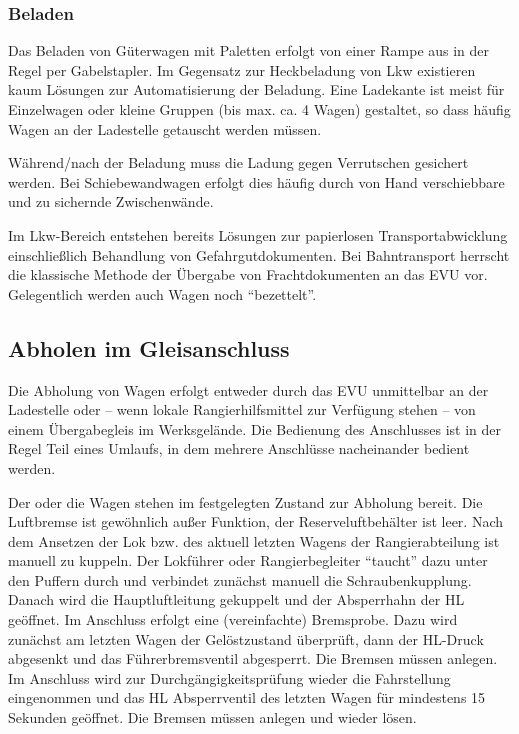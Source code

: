\subsubsection{Beladen}

Das Beladen von Güterwagen mit Paletten erfolgt von einer Rampe aus in der Regel per Gabelstapler. Im Gegensatz zur Heckbeladung von Lkw existieren kaum Lösungen zur Automatisierung der Beladung. Eine Ladekante ist meist für Einzelwagen oder kleine Gruppen (bis max. ca. 4 Wagen) gestaltet, so dass häufig Wagen an der Ladestelle getauscht werden müssen.

Während/nach der Beladung muss die Ladung gegen Verrutschen gesichert werden. Bei Schiebewandwagen erfolgt dies häufig durch von Hand verschiebbare und zu sichernde Zwischenwände.
 
Im Lkw-Bereich entstehen bereits Lösungen zur papierlosen Transportabwicklung einschließlich Behandlung von Gefahrgutdokumenten. Bei Bahntransport herrscht die klassische Methode der Übergabe von Frachtdokumenten an das EVU vor. Gelegentlich werden auch Wagen noch "`bezettelt"'.





\subsection{Abholen im Gleisanschluss}
Die Abholung von Wagen erfolgt entweder durch das EVU unmittelbar an der Ladestelle oder -- wenn lokale Rangierhilfsmittel zur Verfügung stehen -- von einem Übergabegleis im Werksgelände. Die Bedienung des Anschlusses ist in der Regel Teil eines Umlaufs, in dem mehrere Anschlüsse nacheinander bedient werden. 

Der oder die Wagen stehen im festgelegten Zustand zur Abholung bereit. Die Luftbremse ist gewöhnlich außer Funktion, der Reserveluftbehälter ist leer. Nach dem Ansetzen der Lok bzw. des aktuell letzten Wagens der Rangierabteilung ist manuell zu kuppeln. Der Lokführer oder Rangierbegleiter "`taucht"' dazu unter den Puffern durch und verbindet zunächst manuell die Schraubenkupplung. Danach wird die Hauptluftleitung gekuppelt und der Absperrhahn der HL geöffnet. Im Anschluss erfolgt eine (vereinfachte) Bremsprobe. Dazu wird zunächst am letzten Wagen der Gelöstzustand überprüft, dann der HL-Druck abgesenkt und das Führerbremsventil abgesperrt. Die Bremsen müssen anlegen. Im Anschluss wird zur Durchgängigkeitsprüfung wieder die Fahrstellung eingenommen und das HL Absperrventil des letzten Wagen für mindestens 15 Sekunden geöffnet. Die Bremsen müssen anlegen und wieder lösen.

